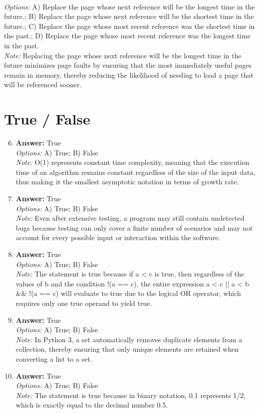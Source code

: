 \documentclass[12pt]{article}
\begin{document}
\begin{enumerate}[label=\arabic*.]
\\ \textit{Options:} A) Replace the page whose next reference will be the longest time in the future.; B) Replace the page whose next reference will be the shortest time in the future.; C) Replace the page whose most recent reference was the shortest time in the past.; D) Replace the page whose most recent reference was the longest time in the past.
\\ \textit{Note:} Replacing the page whose next reference will be the longest time in the future minimizes page faults by ensuring that the most immediately useful pages remain in memory, thereby reducing the likelihood of needing to load a page that will be referenced sooner.
\end{enumerate}

\section*{True / False}
\begin{enumerate}[label=\arabic*.]
\setcounter{enumi}{5}
\item \textbf{Answer:} True
\\ \textit{Options:} A) True; B) False
\\ \textit{Note:} O(1) represents constant time complexity, meaning that the execution time of an algorithm remains constant regardless of the size of the input data, thus making it the smallest asymptotic notation in terms of growth rate.
\item \textbf{Answer:} True
\\ \textit{Options:} A) True; B) False
\\ \textit{Note:} Even after extensive testing, a program may still contain undetected bugs because testing can only cover a finite number of scenarios and may not account for every possible input or interaction within the software.
\item \textbf{Answer:} True
\\ \textit{Options:} A) True; B) False
\\ \textit{Note:} The statement is true because if a \textless{} c is true, then regardless of the values of b and the condition !(a == c), the entire expression a \textless{} c || a \textless{} b \&\& !(a == c) will evaluate to true due to the logical OR operator, which requires only one true operand to yield true.
\item \textbf{Answer:} True
\\ \textit{Options:} A) True; B) False
\\ \textit{Note:} In Python 3, a set automatically removes duplicate elements from a collection, thereby ensuring that only unique elements are retained when converting a list to a set.
\item \textbf{Answer:} True
\\ \textit{Options:} A) True; B) False
\\ \textit{Note:} The statement is true because in binary notation, 0.1 represents 1/2, which is exactly equal to the decimal number 0.5.
\end{enumerate}
\end{document}
